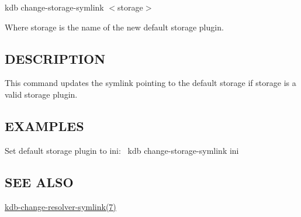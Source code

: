 {\ttfamily kdb change-\/storage-\/symlink $<$storage$>$}

Where {\ttfamily storage} is the name of the new default storage plugin.

\subsection*{D\+E\+S\+C\+R\+I\+P\+T\+I\+ON}

This command updates the symlink pointing to the default storage if {\ttfamily storage} is a valid storage plugin.

\subsection*{E\+X\+A\+M\+P\+L\+ES}

Set default storage plugin to ini\+:~\newline
 {\ttfamily kdb change-\/storage-\/symlink ini}

\subsection*{S\+EE A\+L\+SO}


\begin{DoxyItemize}
\item \hyperlink{md_doc_help_kdb-change-resolver-symlink_doc_help_kdb-change-resolver-symlink_md}{kdb-\/change-\/resolver-\/symlink(7)} 
\end{DoxyItemize}